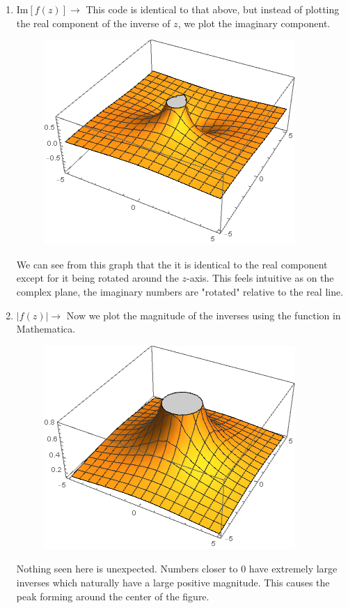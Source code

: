 \documentclass{article}
\begin{document}
\begin{enumerate}
\begin{enumerate}
		\item Im$\left[f(z)\right] \rightarrow$ 
		This code is identical to that above, but instead of plotting the real component of the inverse of $z$, we plot the imaginary component.
			\begin{figure}[H]
			\includegraphics[scale=0.8]{image2.png}
			\end{figure}
		We can see from this graph that the it is identical to the real component except for it being rotated around the $z$-axis. This feels intuitive as on the complex plane, the imaginary numbers are "rotated" relative to the real line.
		
		\item $|f(z)| \rightarrow$ 
		Now we plot the magnitude of the inverses using the  function in Mathematica.
			\begin{figure}[H]
			\includegraphics[scale=0.8]{image3.png}
			\end{figure}
		Nothing seen here is unexpected. Numbers closer to $0$ have extremely large inverses which naturally have a large positive magnitude. This causes the peak forming around the center of the figure.  
		

\end{enumerate}
\end{enumerate}
\end{document}
